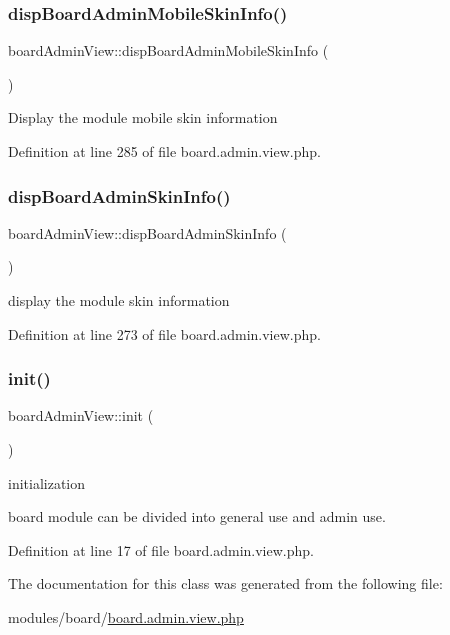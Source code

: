 \subsubsection{\texorpdfstring{disp\+Board\+Admin\+Mobile\+Skin\+Info()}{dispBoardAdminMobileSkinInfo()}}
{\footnotesize\ttfamily board\+Admin\+View\+::disp\+Board\+Admin\+Mobile\+Skin\+Info (\begin{DoxyParamCaption}{ }\end{DoxyParamCaption})}

Display the module mobile skin information 

Definition at line 285 of file board.\+admin.\+view.\+php.

\hypertarget{classboardAdminView_a5cdd047b72e824441b70c4862c774b49}{}\label{classboardAdminView_a5cdd047b72e824441b70c4862c774b49} 
\subsubsection{\texorpdfstring{disp\+Board\+Admin\+Skin\+Info()}{dispBoardAdminSkinInfo()}}
{\footnotesize\ttfamily board\+Admin\+View\+::disp\+Board\+Admin\+Skin\+Info (\begin{DoxyParamCaption}{ }\end{DoxyParamCaption})}



display the module skin information 



Definition at line 273 of file board.\+admin.\+view.\+php.

\hypertarget{classboardAdminView_ac0c66d07632b7766e07543149e0b8cc5}{}\label{classboardAdminView_ac0c66d07632b7766e07543149e0b8cc5} 
\subsubsection{\texorpdfstring{init()}{init()}}
{\footnotesize\ttfamily board\+Admin\+View\+::init (\begin{DoxyParamCaption}{ }\end{DoxyParamCaption})}



initialization 

board module can be divided into general use and admin use.~\newline


Definition at line 17 of file board.\+admin.\+view.\+php.



The documentation for this class was generated from the following file\+:\begin{DoxyCompactItemize}
\item 
modules/board/\hyperlink{board_8admin_8view_8php}{board.\+admin.\+view.\+php}\end{DoxyCompactItemize}
